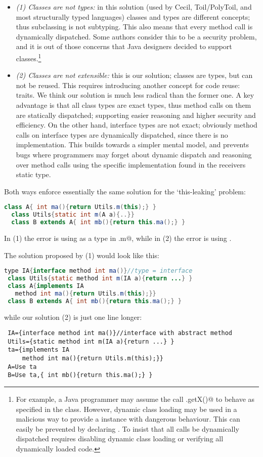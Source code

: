 \begin{itemize}
\item \emph{(1) Classes are not types:} 
in this solution (used by Cecil, Toil/PolyToil, and most structurally typed languages) classes and types are different concepts; thus subclassing is not subtyping.
This also means that every method call is dynamically dispatched. Some authors consider this to be a security problem, and it is out of those concerns that Java designers decided to support \Q@final@ classes.\footnote{
For example, a Java programmer may assume the call \Q@myPoint.getX()@ to behave as specified in the \Q@Point@ class. However, dynamic class loading may be used in a malicious way to provide a \Q@Point@ instance with 
dangerous behaviour. This can easily be prevented by declaring \Q@Point@ \Q@final@. To insist that all calls be dynamically dispatched requires disabling dynamic class loading or verifying all dynamically loaded code.}
\item \emph{(2) Classes are not extensible:}
this is our solution; classes are types, but can not be reused. This requires introducing another concept for code reuse: traits.
We think our solution is much less radical than the former one.
A key advantage is that all class types are exact types, thus method calls on them are statically dispatched; supporting easier reasoning and higher security and efficiency.
%
On the other hand, interface types are not exact;
obviously method calls on interface types are dynamically dispatched, since there is no implementation.
%
This builds towards a simpler mental model, and prevents bugs where programmers may forget about dynamic dispatch and reasoning over method calls using the specific implementation found in the receivers static type.
\end{itemize}

Both ways enforce essentially the same solution for the `this-leaking' problem:
\begin{lstlisting}[language=Java]
  class A{ int ma(){return Utils.m(this);} }
  class Utils{static int m(A a){..}}
  class B extends A{ int mb(){return this.ma();} }  
\end{lstlisting}
In (1) the error is using \Q@A@ as a type in \Q@Utils.m@,
while in (2) the error is using \Q@extends@.

The solution proposed by (1) would look like this:
\begin{lstlisting}[language=Java, morekeywords={type, method}]
 type IA{interface method int ma()}//type = interface
 class Utils{static method int m(IA a){return ...} }
 class A{implements IA 
   method int ma(){return Utils.m(this);}}
 class B extends A{ int mb(){return this.ma();} }  
\end{lstlisting}
while our solution (2) is just one line longer:
\begin{lstlisting}
 IA={interface method int ma()}//interface with abstract method
 Utils={static method int m(IA a){return ...} }
 ta={implements IA
     method int ma(){return Utils.m(this);}}
 A=Use ta
 B=Use ta,{ int mb(){return this.ma();} }  
\end{lstlisting}


